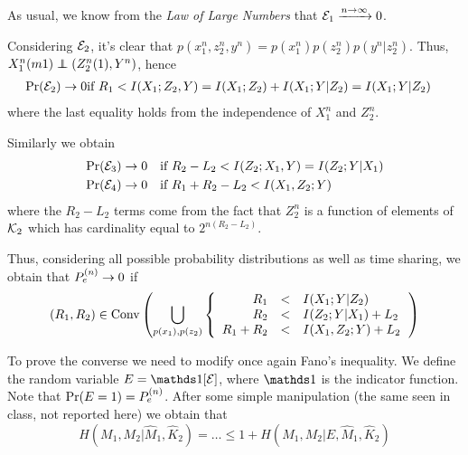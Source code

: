 As usual, we know from the \textit{Law of Large Numbers} that $\mathcal{E}_1 \xrightarrow{n \rightarrow \infty} 0$.

Considering $\mathcal{E}_2$, it's clear that $p(x_1^n,z_2^n,y^n) = p(x_1^n)p(z_2^n)p(y^n|z_2^n)$. Thus, $X_1^n(m1) \independent (Z_2^n(1),Y^n)$, hence
%
\begin{eqnarray}
\Pr(\mathcal{E}_2) \rightarrow 0 & \text{if } R_1 < I(X_1;Z_2,Y) = I(X_1;Z_2) + I(X_1;Y|Z_2) = I(X_1;Y|Z_2)
\end{eqnarray}
%
where the last equality holds from the independence of $X_1^n$ and $Z_2^n$.

Similarly we obtain
%
\begin{align}
\begin{split}
\Pr(\mathcal{E}_3) \rightarrow 0 \quad& \text{if } R_2-L_2 < I(Z_2;X_1,Y) = I(Z_2;Y|X_1)\\
\Pr(\mathcal{E}_4) \rightarrow 0 \quad& \text{if } R_1+R_2-L_2 < I(X_1,Z_2;Y)
\end{split}
\end{align}
%
where the $R_2-L_2$ terms come from the fact that $Z_2^n$ is a function of elements of $\mathcal{K}_2$ which has cardinality equal to $2^{n(R_2-L_2)}$.

Thus, considering all possible probability distributions as well as time sharing, we obtain that $ P_e^{(n)}  \rightarrow 0$ if
%
\begin{equation}
(R_1,R_2) \in \operatorname{Conv} \qty(\bigcup_{p(x_1),p(z_2)}
\left\{
\begin{array}{rcl}
R_1 &<& I(X_1;Y|Z_2)\\
R_2 &<& I(Z_2;Y|X_1) + L_2\\
R_1+R_2 &<& I(X_1,Z_2;Y) + L_2
\end{array}
\right.
) \label{eq:4.12_achiev_region}
\end{equation}


To prove the converse we need to modify once again Fano's inequality. We define the random variable $E = \indicator[\E]$, where $\indicator$ is the indicator function. Note that $\Pr(E=1) =  P_e^{(n)} $. After some simple manipulation (the same seen in class, not reported here) we obtain that
%
\begin{equation}
H(M_1,M_2|\hat{M}_1,\hat{K}_2) = \ldots \leq 1 + H(M_1,M_2|E,\hat{M}_1,\hat{K}_2)
\end{equation}

